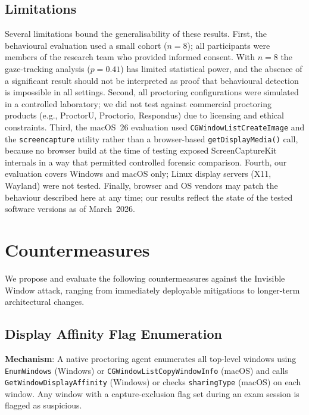 \documentclass[conference]{IEEEtran}
\begin{document}
\subsection{Limitations}

Several limitations bound the generalisability of these results. First, the behavioural evaluation used a small cohort ($n=8$); all participants were members of the research team who provided informed consent. With $n=8$ the gaze-tracking analysis ($p = 0.41$) has limited statistical power, and the absence of a significant result should not be interpreted as proof that behavioural detection is impossible in all settings. Second, all proctoring configurations were simulated in a controlled laboratory; we did not test against commercial proctoring products (e.g., ProctorU, Proctorio, Respondus) due to licensing and ethical constraints. Third, the macOS~26 evaluation used \texttt{CGWindowListCreateImage} and the \texttt{screencapture} utility rather than a browser-based \texttt{getDisplayMedia()} call, because no browser build at the time of testing exposed ScreenCaptureKit internals in a way that permitted controlled forensic comparison. Fourth, our evaluation covers Windows and macOS only; Linux display servers (X11, Wayland) were not tested. Finally, browser and OS vendors may patch the behaviour described here at any time; our results reflect the state of the tested software versions as of March~2026.

\section{Countermeasures}

We propose and evaluate the following countermeasures against the Invisible Window attack, ranging from immediately deployable mitigations to longer-term architectural changes.

\subsection{Display Affinity Flag Enumeration}

\textbf{Mechanism}: A native proctoring agent enumerates all top-level windows using \texttt{EnumWindows} (Windows) or \texttt{CGWindowListCopyWindowInfo} (macOS) and calls \texttt{GetWindowDisplayAffinity} (Windows) or checks \texttt{sharingType} (macOS) on each window. Any window with a capture-exclusion flag set during an exam session is flagged as suspicious.
\end{document}
